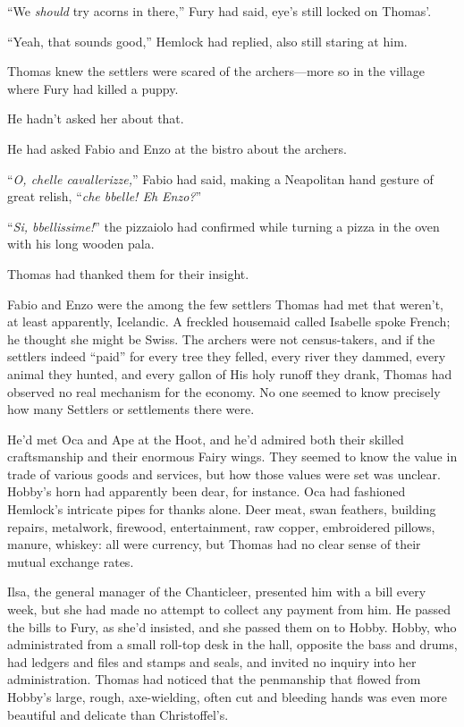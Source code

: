 \documentclass[11pt,a5paper]{article}
\begin{document}
``We \emph{should} try acorns in there,'' Fury had said, eye's still locked on Thomas'.

``Yeah, that sounds good,'' Hemlock had replied, also still staring at him.

Thomas knew the settlers were scared of the archers---more so in the village where Fury had killed a puppy.

He hadn't asked her about that.

He had asked Fabio and Enzo at the bistro about the archers.

``\emph{O, chelle cavallerizze,}'' Fabio had said, making a Neapolitan hand gesture of great relish, ``\emph{che bbelle! Eh Enzo?}''

``\emph{Si, bbellissime!}'' the pizzaiolo had confirmed while turning a pizza in the oven with his long wooden pala.

Thomas had thanked them for their insight.

Fabio and Enzo were the among the few settlers Thomas had met that weren't, at least apparently, Icelandic. A freckled housemaid called Isabelle spoke French; he thought she might be Swiss. The archers were not census-takers, and if the settlers indeed ``paid'' for every tree they felled, every river they dammed, every animal they hunted, and every gallon of His holy runoff they drank, Thomas had observed no real mechanism for the economy. No one seemed to know precisely how many Settlers or settlements there were.

He'd met Oca and Ape at the Hoot, and he'd admired both their skilled craftsmanship and their enormous Fairy wings. They seemed to know the value in trade of various goods and services, but how those values were set was unclear. Hobby's horn had apparently been dear, for instance. Oca had fashioned Hemlock's intricate pipes for thanks alone. Deer meat, swan feathers, building repairs, metalwork, firewood, entertainment, raw copper, embroidered pillows, manure, whiskey: all were currency, but Thomas had no clear sense of their mutual exchange rates.

Ilsa, the general manager of the Chanticleer, presented him with a bill every week, but she had made no attempt to collect any payment from him. He passed the bills to Fury, as she'd insisted, and she passed them on to Hobby. Hobby, who administrated from a small roll-top desk in the hall, opposite the bass and drums, had ledgers and files and stamps and seals, and invited no inquiry into her administration. Thomas had noticed that the penmanship that flowed from Hobby's large, rough, axe-wielding, often cut and bleeding hands was even more beautiful and delicate than Christoffel's.
\end{document}
